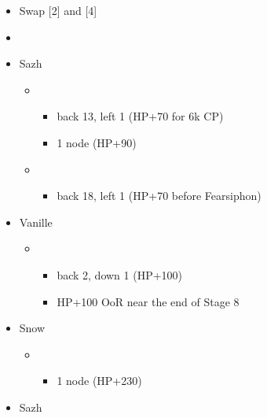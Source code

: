 \begin{menu}
	\begin{itemize}
	\paradigm
		\begin{itemize}
			\item Swap [2] and [4]
			\item {}%
				{\paradigmline{\com}{(\med)}{(\sen)}}%
				{\paradigmline{(\com)}{\sab}{(\sen)}}%
				{\paradigmline{\sen}{\med}{\sen}}%
				{\paradigmline[4]{\sen}{(\sen)}{\sen}}%
				{\paradigmline{\rav}{\med}{\sen}}%
				{\paradigmline{(\com)}{\rav}{(\sen)}}%
		\end{itemize}
	\crystarium
		\begin{itemize}
			\item Sazh
				\begin{itemize}
					\item \com
						\begin{itemize}
							\item back 13, left 1 (HP+70 for 6k CP)
							\item 1 node (HP+90)
						\end{itemize}
					\item \rav
						\begin{itemize}
							\item back 18, left 1 (HP+70 before Fearsiphon)
						\end{itemize}
				\end{itemize}
			\item Vanille
				\begin{itemize}
					\item \rav
						\begin{itemize}
							\item back 2, down 1 (HP+100)
							\item HP+100 OoR near the end of Stage 8
						\end{itemize}
				\end{itemize}
			\item Snow
				\begin{itemize}
					\item \com
						\begin{itemize}
							\item 1 node (HP+230)
						\end{itemize}
				\end{itemize}
		\end{itemize}
	\equip
		\begin{itemize}
			\item Sazh

\end{itemize}
\end{itemize}
\end{menu}
